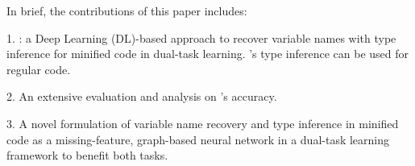 In brief, the contributions of this paper includes:

1. {\bf {\tool}}: a Deep Learning (DL)-based approach to recover
variable names with type inference for minified code in dual-task
learning. {\tool}'s type inference can be used for regular code.

2. An extensive evaluation and analysis on {\tool}'s
accuracy.



3. A novel formulation of variable name recovery and type inference in
minified code as a missing-feature, graph-based neural network in
a dual-task learning framework to benefit both tasks.

